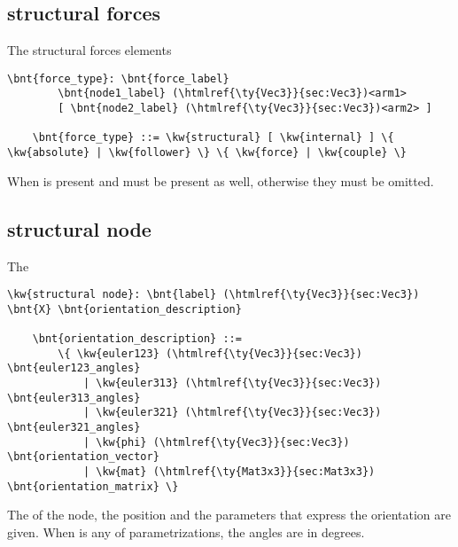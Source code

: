 \subsection{structural forces}
The structural forces elements
\begin{Verbatim}[commandchars=\\\{\}]
    \bnt{force_type}: \bnt{force_label}
        \bnt{node1_label} (\htmlref{\ty{Vec3}}{sec:Vec3})<arm1>
        [ \bnt{node2_label} (\htmlref{\ty{Vec3}}{sec:Vec3})<arm2> ]

    \bnt{force_type} ::= \kw{structural} [ \kw{internal} ] \{ \kw{absolute} | \kw{follower} \} \{ \kw{force} | \kw{couple} \}
\end{Verbatim}
When  is present  and  must be present
as well, otherwise they must be omitted.

\subsection{structural node}
\label{sec:APP:LOGFILE:STRUCTURAL_NODE}
The 
\begin{Verbatim}[commandchars=\\\{\}]
    \kw{structural node}: \bnt{label} (\htmlref{\ty{Vec3}}{sec:Vec3}) \bnt{X} \bnt{orientation_description}

    \bnt{orientation_description} ::=
        \{ \kw{euler123} (\htmlref{\ty{Vec3}}{sec:Vec3}) \bnt{euler123_angles}
            | \kw{euler313} (\htmlref{\ty{Vec3}}{sec:Vec3}) \bnt{euler313_angles}
            | \kw{euler321} (\htmlref{\ty{Vec3}}{sec:Vec3}) \bnt{euler321_angles}
            | \kw{phi} (\htmlref{\ty{Vec3}}{sec:Vec3}) \bnt{orientation_vector}
            | \kw{mat} (\htmlref{\ty{Mat3x3}}{sec:Mat3x3}) \bnt{orientation_matrix} \}
\end{Verbatim}
The  of the node, the position 
and the  parameters that express the orientation
are given.
When  is any of  parametrizations,
the angles are in degrees.

